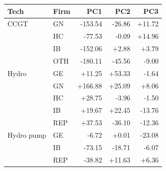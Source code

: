\begin{tabular}{l l r r r}
\toprule
Tech & Firm & PC1 & PC2 & PC3 \\
\midrule
CCGT & GN & -153.54 & -26.86 & +11.72 \\
 & HC & -77.53 & -0.09 & +14.96 \\
 & IB & -152.06 & +2.88 & +3.79 \\
 & OTH & -180.11 & -45.56 & -9.00 \\
\addlinespace
Hydro & GE & +11.25 & +53.33 & -1.64 \\
 & GN & +166.88 & +25.09 & +8.06 \\
 & HC & +28.75 & -3.96 & -1.50 \\
 & IB & +19.67 & +22.45 & -13.76 \\
 & REP & +37.53 & -36.10 & -12.36 \\
\addlinespace
Hydro pump & GE & -6.72 & +0.01 & -23.08 \\
 & IB & -73.15 & -18.71 & -6.07 \\
 & REP & -38.82 & +11.63 & +6.36 \\
\bottomrule
\end{tabular}